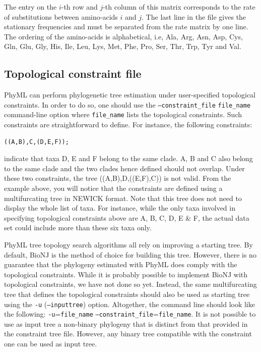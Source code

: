 \documentclass[a4paper,12pt]{article}
\newcommand{\x}[1]{\texttt{#1}}
\begin{document}
The  entry  on the  $i$-th  row  and  $j$-th  column of  this  matrix  corresponds  to the  rate  of
substitutions between  amino-acids $i$  and $j$.   The last line  in the  file gives  the stationary
frequencies and must be separated from the rate  matrix by one line. The ordering of the amino-acids
is alphabetical,  i.e, Ala, Arg, Asn, Asp,  Cys, Gln, Glu, Gly,  His, Ile, Leu, Lys,  Met, Phe, Pro,
Ser, Thr, Trp, Tyr and Val.


\subsection{Topological constraint file}\label{sec:topoconstraints}

PhyML can perform phylogenetic tree estimation under user-specified topological constraints. In
order to do so, one should use the \x{--constraint\_file}  \x{file\_name} command-line option where
\x{file\_name} lists the topological constraints. Such constraints are  straightforward to
define. For instance, the following constraints:
\vspace{0.2cm}
\begin{Verbatim}
((A,B),C,(D,E,F));
\end{Verbatim}
indicate that taxa D, E and F belong to the same clade. A, B and C also belong to the
same  clade and the  two clades  hence defined  should not  overlap. Under  these two
constraints, the tree ((A,B),D,((E,F),C)) is not valid. From the example above, you will notice that
the constraints are defined  using a multifurcating tree in NEWICK format.  Note that this tree does
not need to display the whole list of taxa. For instance, while the only taxa involved in specifying
topological constraints above  are A, B, C, D, E  \& F, the actual data set  could include more than
these six taxa only.

PhyML tree topology  search algorithms all rely on  improving a starting tree. By  default, BioNJ is
the method  of choice  for building this  tree. However,  there is no  guarantee that  the phylogeny
estimated with PhyML does comply with the  topological constraints. While it is probably possible to
implement  BioNJ  with  topological constraints,  we  have  not  done  so yet.   Instead,  the  same
multifurcating tree that  defines the topological constraints  should also be used  as starting tree
using  the \x{-u}  (\x{--inputtree})  option. Altogether,  the  command line  should  look like  the
following: \x{-u}=\x{file\_name} \x{--constraint\_file}=\x{file\_name}. It is not possible to use as
input  tree a  non-binary phylogeny  that is  distinct  from that  provided in  the constraint  tree
file. However, any binary tree compatible with the constraint one can be used as input tree.
\end{document}
